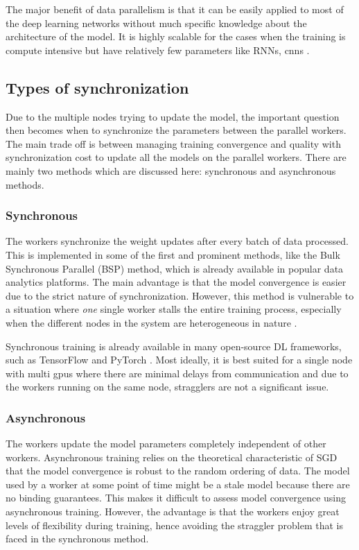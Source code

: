 The major benefit of data parallelism is that it can be easily applied to most of the deep learning networks without much specific knowledge about the architecture of the model. It is highly scalable for the cases when the training is compute intensive but have relatively few parameters like RNNs, \acrshort{cnn}s \cite{Krizhevsky2014OneNetworks}.


\subsection{Types of synchronization}
Due to the multiple nodes trying to update the model, the important question then becomes when to synchronize the parameters between the parallel workers. The main trade off is between managing training convergence and quality with synchronization cost to update all the models on the parallel workers. There are mainly two methods which are discussed here: synchronous and asynchronous methods.

\subsubsection{Synchronous}
The workers synchronize the weight updates after every batch of data processed. This is implemented in some of the first and prominent methods, like the Bulk Synchronous Parallel (BSP) \cite{Valiant1990AComputation} method, which is already available in popular data analytics platforms. The main advantage is that the model convergence is easier due to the strict nature of synchronization. However, this method is vulnerable to a situation where \emph{one} single worker stalls the entire training process, especially when the different nodes in the system are heterogeneous in nature \cite{Cipar2013SolvingStaleness}.

Synchronous training is already available in many open-source DL frameworks, such
as TensorFlow \cite{Abadi2016TensorFlow:Systems} and PyTorch \cite{Paszke2019PyTorch:Library}. Most ideally, it is best suited for a single node with multi \acrshort{gpu}s where there are minimal delays from communication and due to the workers running on the same node, stragglers are not a significant issue.

\subsubsection{Asynchronous}
The workers update the model parameters completely independent of other workers. Asynchronous training relies on the theoretical characteristic of SGD that the model convergence is robust to the random ordering of data. The model used by a worker at some point of time might be a stale model because there are no binding guarantees. This makes it difficult to assess model convergence using asynchronous training. However, the advantage is that the workers enjoy great levels of flexibility during training, hence avoiding the straggler problem that is faced in the synchronous method.

